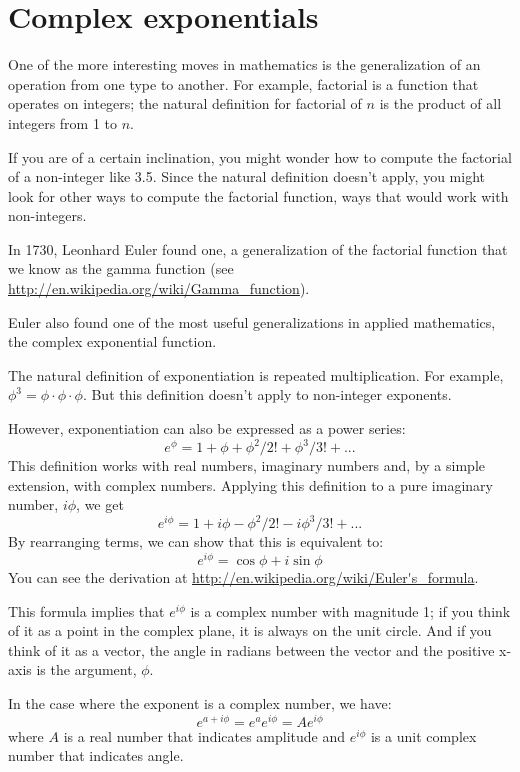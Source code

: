 \documentclass[12pt]{book}
\begin{document}
\section{Complex exponentials}

One of the more interesting moves in mathematics is the generalization
of an operation from one type to another.  For example, factorial is a
function that operates on integers; the natural definition for
factorial of $n$ is the product of all integers from 1 to $n$.

If you are of a certain inclination, you might wonder how to compute
the factorial of a non-integer like 3.5.  Since the natural definition
doesn't apply, you might look for other ways to compute the factorial
function, ways that would work with non-integers.

In 1730, Leonhard Euler found one, a generalization of the factorial
function that we know as the gamma function (see
\url{http://en.wikipedia.org/wiki/Gamma_function}).

Euler also found one of the most useful generalizations in applied
mathematics, the complex exponential function.

The natural definition of exponentiation is repeated multiplication.
For example, $\phi^3 = \phi \cdot \phi \cdot \phi$.  But this
definition doesn't apply to non-integer exponents.

However, exponentiation can also be expressed as a power series:
%
\[ e^\phi = 1 + \phi + \phi^2/2! + \phi^3/3! + ... \]
%
This definition works with real numbers, imaginary numbers and, by a simple
extension, with complex numbers.  Applying this definition
to a pure imaginary number, $i\phi$, we get
%
\[ e^{i\phi} = 1 + i\phi - \phi^2/2! - i\phi^3/3! + ... \]
%
By rearranging terms, we can show that this is equivalent to:
%
\[ e^{i\phi} = \cos \phi + i \sin \phi \]
%
You can see the derivation at
\url{http://en.wikipedia.org/wiki/Euler's_formula}.

This formula
implies that $e^{i\phi}$ is a complex number with magnitude 1; if you
think of it as a point in the complex plane, it is always on the unit
circle.  And if you think of it as a vector, the angle in radians
between the vector and the positive x-axis is the argument, $\phi$.

In the case where the exponent is a complex number, we have:
%
\[ e^{a + i\phi} = e^a e^{i\phi} = A e^{i\phi} \]
%
where $A$ is a real number that indicates amplitude and
$e^{i\phi}$ is a unit complex number that indicates angle.
\end{document}
